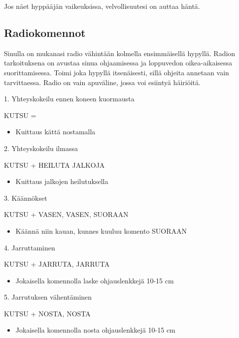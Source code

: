 \begin{multicols}{2}
Jos näet hyppääjän vaikeuksissa, velvollisuutesi on auttaa häntä. 

\subsection{ Radiokomennot }
\label{hyppytapahtuma-radiokomennot}


Sinulla on mukanasi radio vähintään kolmella ensimmäisellä hypyllä. Radion tarkoituksena on avustaa sinua ohjaamisessa ja loppuvedon oikea-aikaisessa suorittamisessa. Toimi joka hypyllä itsenäisesti, sillä ohjeita annetaan vain tarvittaessa. Radio on vain apuväline, jossa voi esiintyä häiriöitä. 


1. Yhteyskokeilu ennen koneen kuormausta  


KUTSU = \raisedrule[0.0em]{0.5pt} \\  

\begin{itemize}
\item   Kuittaus kättä nostamalla 
\end{itemize}

2. Yhteyskokeilu ilmassa 


KUTSU + HEILUTA JALKOJA 

\begin{itemize}
\item  Kuittaus jalkojen heilutuksella 
\end{itemize}

3. Käännökset 


KUTSU + VASEN, VASEN, SUORAAN 

\begin{itemize}
\item  Käännä niin kauan, kunnes kuuluu komento SUORAAN 
\end{itemize}

4. Jarruttaminen 


KUTSU + JARRUTA, JARRUTA 

\begin{itemize}
\item  Jokaisella komennolla laske ohjauslenkkejä 10-15 cm 
\end{itemize}

5. Jarrutuksen vähentäminen 


KUTSU + NOSTA, NOSTA 

\begin{itemize}
\item  Jokaisella komennolla nosta ohjauslenkkejä 10-15 cm 
\end{itemize}


\end{multicols}
